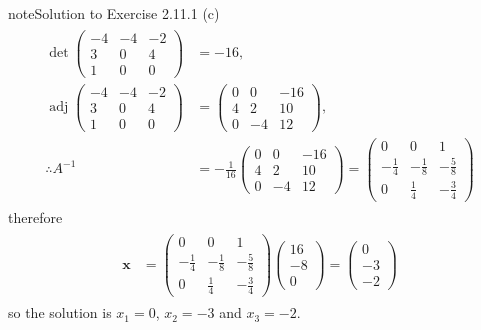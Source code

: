 \documentclass[letterpaper,10pt,english]{jupyterBook}
\begin{document}
\begin{sphinxadmonition}{note}{Solution to Exercise 2.11.1}
\sphinxAtStartPar
(c)
\begin{equation*}
\begin{split} \begin{align*}
    \det\left(\begin{matrix}-4 & -4 & -2\\3 & 0 & 4\\1 & 0 & 0\end{matrix}\right) &= -16, \\ 
    \operatorname{adj}\left(\begin{matrix}-4 & -4 & -2\\3 & 0 & 4\\1 & 0 & 0\end{matrix}\right) &= \left(\begin{matrix}0 & 0 & -16\\4 & 2 & 10\\0 & -4 & 12\end{matrix}\right), \\ 
    \therefore A^{-1} &= - \frac{1}{16}\left(\begin{matrix}0 & 0 & -16\\4 & 2 & 10\\0 & -4 & 12\end{matrix}\right) = \left(\begin{matrix}0 & 0 & 1\\- \frac{1}{4} & - \frac{1}{8} & - \frac{5}{8}\\0 & \frac{1}{4} & - \frac{3}{4}\end{matrix}\right) 
\end{align*} \end{split}
\end{equation*}
\sphinxAtStartPar
therefore
\begin{equation*}
\begin{split}\begin{align*}
    \mathbf{x} &= \left(\begin{matrix}0 & 0 & 1\\- \frac{1}{4} & - \frac{1}{8} & - \frac{5}{8}\\0 & \frac{1}{4} & - \frac{3}{4}\end{matrix}\right)
    \left(\begin{matrix}16\\-8\\0\end{matrix}\right) = 
    \left(\begin{matrix}0\\-3\\-2\end{matrix}\right)
\end{align*} \end{split}
\end{equation*}
\sphinxAtStartPar
so the solution is \(x_1 = 0\), \(x_2 = -3\) and \(x_3 = -2\).


\end{sphinxadmonition}
\end{document}

